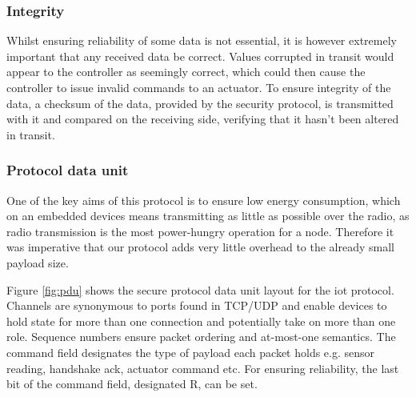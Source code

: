 \documentclass[conference]{./sty/IEEEtran}
\begin{document}
\subsubsection*{Integrity} %
\label{ssub:integrity}
Whilst ensuring reliability of some data is not essential, it is however extremely important that any received data be correct. Values corrupted in transit would appear to the controller as seemingly correct, which could then cause the controller to issue invalid commands to an actuator. To ensure integrity of the data, a checksum of the data, provided by the security protocol, is transmitted with it and compared on the receiving side, verifying that it hasn't been altered in transit.  

\subsubsection*{Protocol data unit} %
\label{ssub:protocol_data_unit}
One of the key aims of this protocol is to ensure low energy consumption, which on an embedded devices means transmitting as little as possible over the radio, as radio transmission is the most power-hungry operation for a node. Therefore it was imperative that our protocol adds very little overhead to the already small payload size.

Figure \ref{fig:pdu} shows the secure protocol data unit layout for the iot protocol. Channels are synonymous to ports found in TCP/UDP and enable devices to hold state for more than one connection and potentially take on more than one role. Sequence numbers ensure packet ordering and at-most-one semantics. The command field designates the type of payload each packet holds e.g. sensor reading, handshake ack, actuator command etc. For ensuring reliability, the last bit of the command field, designated R, can be set.
\end{document}
